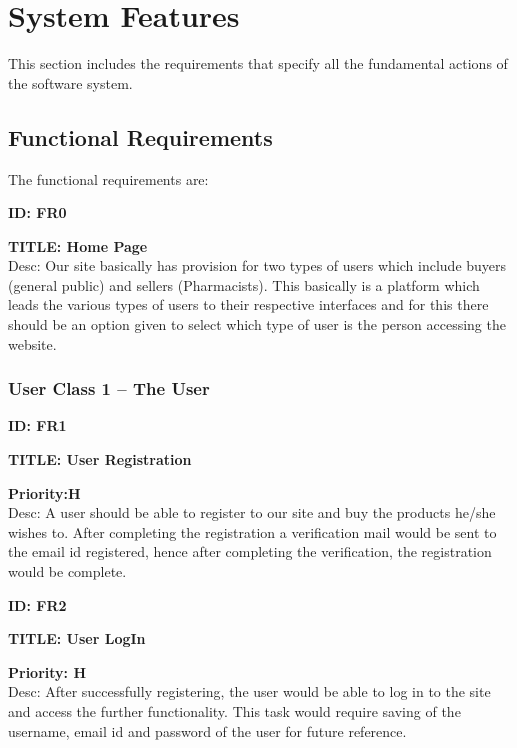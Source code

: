 \documentclass{scrreprt}
\begin{document}
\chapter{System Features}
This section includes the requirements that specify all the fundamental actions of the software system.

\section{Functional Requirements}
The functional requirements are:\\

\item \textbf{ID: FR0}
\item \textbf{TITLE: Home Page}\\
Desc: Our site basically has provision for two types of users which include buyers (general public) and sellers (Pharmacists). This basically is a platform which leads the various types of users to their respective interfaces and for this there should be an option given to select which type of user is the person accessing the website.\\

\subsection{User Class 1 – The User}  

\item \textbf{ID: FR1}
\item \textbf{TITLE: User Registration}
\item \textbf{Priority:H}\\
Desc: A user should be able to register to our site and buy the products he/she wishes to. After completing the registration a verification mail would be sent to the email id registered, hence after completing the verification, the registration would be complete.\\

\item \textbf{ID: FR2}
\item \textbf{TITLE: User LogIn}
\item \textbf{Priority: H}  \\
Desc: After successfully registering, the user  would be able to log in to the site and access the further functionality. This task would require saving of the username, email id and password of the user for future reference.\\
\end{document}
